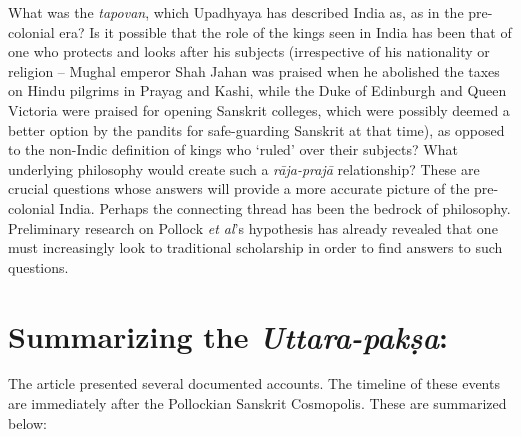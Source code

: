 What was the \textit{tapovan}, which Upadhyaya has described India as, as in the pre-colonial era? Is it possible that the role of the kings seen in India has been that of one who protects and looks after his subjects (irrespective of his nationality or religion – Mughal emperor Shah Jahan was praised when he abolished the taxes on Hindu pilgrims in Prayag and Kashi, while the Duke of Edinburgh and Queen Victoria were praised for opening Sanskrit colleges, which were possibly deemed a better option by the pandits for safe-guarding Sanskrit at that time), as opposed to the non-Indic definition of kings who ‘ruled’ over their subjects? What underlying philosophy would create such a \textit{rāja-prajā} relationship? These are crucial questions whose answers will provide a more accurate picture of the pre-colonial India. Perhaps the connecting thread has been the bedrock of philosophy. Preliminary research on Pollock \textit{et al}’s hypothesis has already revealed that one must increasingly look to traditional scholarship in order to find answers to such questions.


\section*{Summarizing the \textit{Uttara-pakṣa}:}

The article presented several documented accounts. The timeline of these events are immediately after the Pollockian Sanskrit Cosmopolis. These are summarized below:

